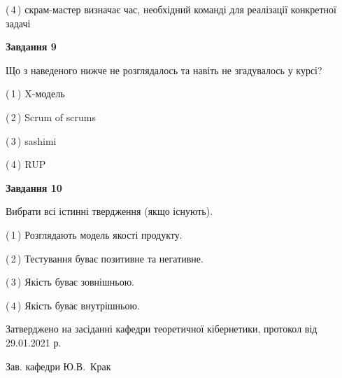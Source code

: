 \documentclass[10pt, ukrainian]{article}
\begin{document}
{\begin {large}
(\,4\,) скрам-мастер визначає час, необхідний команді для реалізації конкретної задачі%


{\begin {center}\textbf{Завдання 9}\end {center}}\par
Що з наведеного нижче не розглядалось та навіть не згадувалось у курсі?\par
\vspace{2mm}



(\,1\,) X-модель%



(\,2\,) Scrum of scrums%



(\,3\,) sashimi%



(\,4\,) RUP%


{\begin {center}\textbf{Завдання 10}\end {center}}\par
Вибрати всі істинні твердження (якщо існують).\par
\vspace{2mm}



(\,1\,) Розглядають модель якості продукту.%



(\,2\,) Тестування буває позитивне та негативне.%



(\,3\,) Якість буває зовнішньою.%



(\,4\,) Якість буває внутрішньою.%



\end {large}}
{\vspace{5mm}\smallskip \begin {small} Затверджено на засіданні кафедри теоретичної кібернетики, протокол  від   29.01.2021 р.\par\smallskip\smallskip
{\parbox {6.5 cm}{Зав. кафедри \dotfill Ю.В.~Крак}} \end{small}}
\newpage
\end{document}
